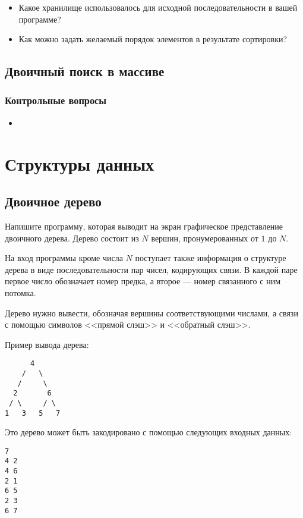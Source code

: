 \documentclass[10pt,twoside,openany]{book}
\begin{document}
\begin{itemize}
    \item Какое хранилище использовалось для исходной последовательности в вашей программе?
    \item Как можно задать желаемый порядок элементов в результате сортировки?
\end{itemize}

\section{Двоичный поиск в массиве}

\subsection*{Контрольные вопросы}

\begin{itemize}
    \item
\end{itemize}


\chapter{Структуры данных}

\section{Двоичное дерево}

Напишите программу, которая выводит на экран графическое представление двоичного дерева.
Дерево состоит из $N$ вершин, пронумерованных от $1$ до $N$.

На вход программы кроме числа $N$ поступает также информация о структуре дерева
в виде последовательности пар чисел, кодирующих связи.
В каждой паре первое число обозначает номер предка, а второе --- номер связанного с ним потомка.

Дерево нужно вывести, обозначая вершины соответствующими числами, а связи с помощью символов
<<прямой слэш>> и <<обратный слэш>>.

Пример вывода дерева:
\begin{verbatim}
      4
    /   \
   /     \
  2       6
 / \     / \
1   3   5   7
\end{verbatim}

Это дерево может быть закодировано с помощью следующих входных данных:
\begin{verbatim}
7
4 2
4 6
2 1
6 5
2 3
6 7
\end{verbatim}
\end{document}
